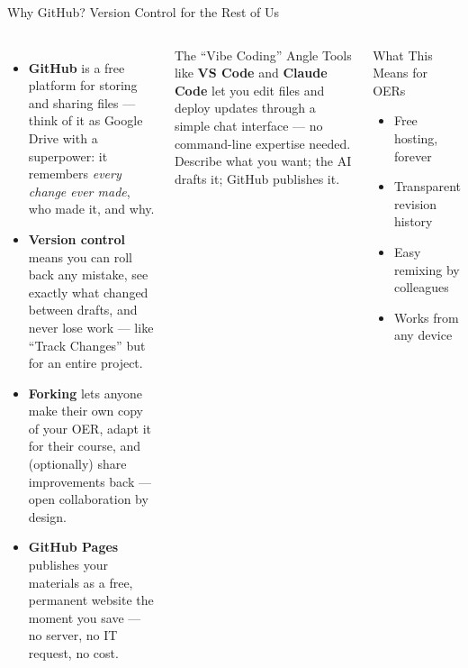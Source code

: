 \documentclass[aspectratio=169,10pt]{beamer}
\begin{document}
\begin{frame}{Why GitHub? Version Control for the Rest of Us}
\begin{columns}[c]
\begin{itemize}
  \item \textbf{GitHub} is a free platform for storing and sharing files --- think of it as Google Drive with a superpower: it remembers \emph{every change ever made}, who made it, and why.
  \item \textbf{Version control} means you can roll back any mistake, see exactly what changed between drafts, and never lose work --- like ``Track Changes'' but for an entire project.
  \item \textbf{Forking} lets anyone make their own copy of your OER, adapt it for their course, and (optionally) share improvements back --- open collaboration by design.
  \item \textbf{GitHub Pages} publishes your materials as a free, permanent website the moment you save --- no server, no IT request, no cost.
\end{itemize}
\begin{block}{The ``Vibe Coding'' Angle}
\footnotesize
Tools like \textbf{VS Code} and \textbf{Claude Code} let you edit files and deploy updates through a simple chat interface --- no command-line expertise needed. Describe what you want; the AI drafts it; GitHub publishes it.
\end{block}
\vspace{0.25em}
\begin{exampleblock}{What This Means for OERs}
\footnotesize
\begin{itemize}
  \item Free hosting, forever
  \item Transparent revision history
  \item Easy remixing by colleagues
  \item Works from any device
\end{itemize}
\end{exampleblock}
\end{columns}
\end{frame}
\end{document}
